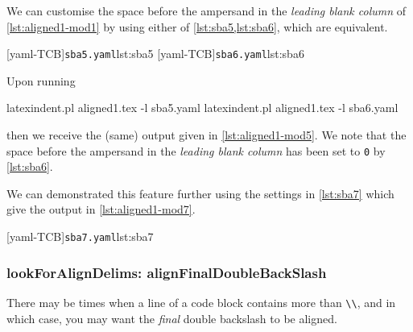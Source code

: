 \begin{example}
 We can customise the space before the ampersand in the \emph{leading blank column} of
 \cref{lst:aligned1-mod1} by using either of \cref{lst:sba5,lst:sba6}, which are
 equivalent.

 \begin{cmhtcbraster}
  [yaml-TCB]{\texttt{sba5.yaml}}{lst:sba5}
  [yaml-TCB]{\texttt{sba6.yaml}}{lst:sba6}
 \end{cmhtcbraster}

 Upon running

 \begin{commandshell}
latexindent.pl aligned1.tex -l sba5.yaml
latexindent.pl aligned1.tex -l sba6.yaml
\end{commandshell}

 then we receive the (same) output given in \cref{lst:aligned1-mod5}. We note that the
 space before the ampersand in the \emph{leading blank column} has been set to \texttt{0}
 by \cref{lst:sba6}.

 We can demonstrated this feature further using the settings in \cref{lst:sba7} which give
 the output in \cref{lst:aligned1-mod7}.

 \begin{cmhtcbraster}[raster columns=3,
   raster left skip=-3.75cm,
   raster right skip=-2cm,]
  [yaml-TCB]{\texttt{sba7.yaml}}{lst:sba7}
 \end{cmhtcbraster}
 \end{example}

\subsubsection{lookForAlignDelims: alignFinalDoubleBackSlash}
 There may be times when a line of a code block contains more than \lstinline!\\!, and in
 which case, you may want the \emph{final} double backslash to be aligned.

